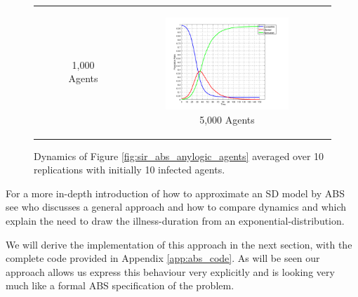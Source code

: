 \begin{figure}
\begin{center}
\begin{tabular}{c c c}
\begin{subfigure}[b]{0.3\textwidth}
			\caption{1,000 Agents}
			\label{fig:sir_abs_agents_repls_1000}
		\end{subfigure}
    	&
		\begin{subfigure}[b]{0.3\textwidth}
			\centering
			\includegraphics[width=1\textwidth, angle=0]{./../shared/fig/frabs/SIR_1000agents_150t_01dt_parallel_10replications.png}
			\caption{5,000 Agents}
			\label{fig:sir_abs_agents_repls_10000}
		\end{subfigure}
	\end{tabular}
	
	\caption{Dynamics of Figure \ref{fig:sir_abs_anylogic_agents} averaged over 10 replications with initially 10 infected agents.} 
	\label{fig:sir_abs_agents_repls}
\end{center}
\end{figure}

For a more in-depth introduction of how to approximate an SD model by ABS see \cite{macal_agent-based_2010} who discusses a general approach and how to compare dynamics and \cite{borshchev_system_2004} which explain the need to draw the illness-duration from an exponential-distribution.

We will derive the implementation of this approach in the next section, with the complete code provided in Appendix \ref{app:abs_code}. As will be seen our approach allows us express this behaviour very explicitly and is looking very much like a formal ABS specification of the problem. 
